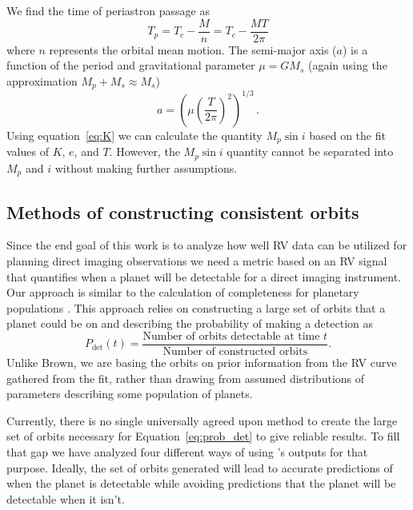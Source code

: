 We find the time of periastron passage as
\begin{equation}
    T_p = T_c - \frac{M}{n} = T_c - \frac{M T}{2\pi}
\end{equation}
where $n$ represents the orbital mean motion.
The semi-major axis ($a$) is a function of the period and gravitational parameter $\mu=G M_s$ (again using
the approximation $M_p + M_s \approx M_s$)
\begin{equation}
    a = {\left( \mu {\left(\frac{ T}{2\pi}\right)}^2 \right)}^{1/3} \,.
\end{equation}
Using equation~\ref{eq:K} we can calculate the quantity $M_p\sin{i}$ based on the fit values of $K$,
$e$, and $T$. However, the $M_p \sin{i}$ quantity cannot be separated into $M_p$ and $i$ without
making further assumptions.

\subsection{Methods of constructing consistent orbits}\label{sec:orbit_methods}
Since the end goal of this work is to analyze how well RV data can be utilized for planning direct imaging observations we
need a metric based on an RV signal that quantifies when a planet will be detectable for a direct
imaging instrument.  Our approach is similar to the calculation of completeness for planetary
populations \citep{brownObscurationalCompleteness2004,
brownSingleVisitPhotometric2005, brownNewCompletenessMethods2010, Garrett2016}.
This approach relies on constructing a
large set of orbits that a planet could be on and describing the probability of making a detection
as 
\begin{equation}\label{eq:prob_det}
    P_{\textrm{det}}(t) = \frac{\textrm{Number of orbits detectable at time $t$}}{\textrm{Number of
    constructed orbits}}
.\end{equation}
Unlike Brown, we are basing the orbits on prior information from the RV curve gathered from the 
 fit, rather than drawing from assumed distributions of parameters describing some population
of planets.

Currently, there is no single universally agreed upon method to create the large set of orbits
necessary for Equation~\ref{eq:prob_det} to give reliable results. To fill that gap we have analyzed
four different ways of using 's outputs for that purpose. Ideally, the set of orbits
generated will lead to accurate predictions of when the planet is detectable while avoiding
predictions that the planet will be detectable when it isn't.


